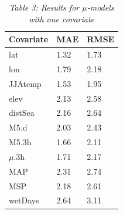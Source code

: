 \documentclass[12pt,a4paper,english]{article}
\begin{document}
\begin{singlespace}
\begin{table}
\begin{minipage}[b]{0.34\linewidth}
\caption*{\sl Table 3: Results for $\mu$-models with one covariate}
\centering
\begin{tabular}{|l|l|l|}
    \hline
    \hline
    \textbf{Covariate}& \textbf{MAE} & \textbf{RMSE} \\
	\hline
	\hline
	\rowcolor{Gray}
	lat & 1.32 & 1.73 \\
	\hline
	\rowcolor{Gray}
	lon & 1.79 & 2.18 \\
	\hline
	\rowcolor{Gray}
	JJAtemp & 1.53 & 1.95 \\
	\hline
	\rowcolor{Gray}
	elev & 2.13 & 2.58 \\
	\hline
	distSea & 2.16 & 2.64 \\
	\hline
	\rowcolor{Gray}
	M5.d & 2.03 & 2.43 \\
	\hline
	\rowcolor{Gray}
	M5.3h & 1.66 & 2.11 \\
	\hline
	\rowcolor{Gray}
	$\mu$.3h & 1.71 & 2.17 \\
	\hline
	MAP & 2.31 & 2.74 \\
	\hline
	MSP & 2.18 & 2.61 \\
	\hline
	wetDays & 2.64 & 3.11 \\
   \hline
   \hline
\end{tabular}


\end{minipage}
\end{table}
\end{singlespace}
\end{document}

